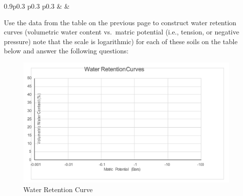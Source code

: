 \documentclass[
  letterpaper,
  twocolumn,
  portrait]{scrbook}
\begin{document}
\begin{table}[h!]
\begin{centerbox}
\begin{threeparttable}
\begin{tabularx}{0.9\textwidth}{p{} p{} p{}}
 &
 &
 \tabularnewline[-0.5pt]


\end{tabularx}
\end{threeparttable}\par\end{centerbox}

\end{table}
 

Use the data from the table on the previous page to construct water
retention curves (volumetric water content vs.~matric potential (i.e.,
tension, or negative pressure) note that the scale is logarithmic) for
each of these soils on the table below and answer the following
questions:

\begin{figure}

{\centering \includegraphics{water-retention-curve-Picture1.png}

}

\caption{\label{fig-waterretention}Water Retention Curve}

\end{figure}
\end{document}
